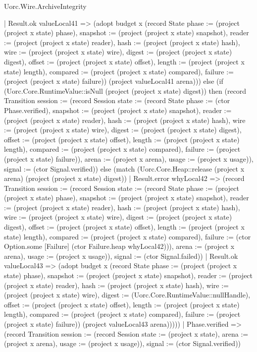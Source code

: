 \begin{lexlean}{Uorc.Wire.ArchiveIntegrity}
\begin{semanticmodule}
{        | Result.ok valueLocal41 => (adopt budget x (record State {phase := (project (project x state) phase), snapshot := (project (project x state) snapshot), reader := (project (project x state) reader), hash := (project (project x state) hash), wire := (project (project x state) wire), digest := (project (project x state) digest), offset := (project (project x state) offset), length := (project (project x state) length), compared := (project (project x state) compared), failure := (project (project x state) failure)}) (project valueLocal41 arena))) else (if (Uorc.Core.RuntimeValue::isNull (project (project x state) digest)) then (record Transition {session := (record Session {state := (record State {phase := (ctor Phase.verified), snapshot := (project (project x state) snapshot), reader := (project (project x state) reader), hash := (project (project x state) hash), wire := (project (project x state) wire), digest := (project (project x state) digest), offset := (project (project x state) offset), length := (project (project x state) length), compared := (project (project x state) compared), failure := (project (project x state) failure)}), arena := (project x arena), usage := (project x usage)}), signal := (ctor Signal.verified)}) else (match (Uorc.Core.Heap::release (project x arena) (project (project x state) digest))
        | Result.error whyLocal42 => (record Transition {session := (record Session {state := (record State {phase := (project (project x state) phase), snapshot := (project (project x state) snapshot), reader := (project (project x state) reader), hash := (project (project x state) hash), wire := (project (project x state) wire), digest := (project (project x state) digest), offset := (project (project x state) offset), length := (project (project x state) length), compared := (project (project x state) compared), failure := (ctor Option.some [Failure] (ctor Failure.heap whyLocal42))}), arena := (project x arena), usage := (project x usage)}), signal := (ctor Signal.failed)})
        | Result.ok valueLocal43 => (adopt budget x (record State {phase := (project (project x state) phase), snapshot := (project (project x state) snapshot), reader := (project (project x state) reader), hash := (project (project x state) hash), wire := (project (project x state) wire), digest := (Uorc.Core.RuntimeValue::nullHandle), offset := (project (project x state) offset), length := (project (project x state) length), compared := (project (project x state) compared), failure := (project (project x state) failure)}) (project valueLocal43 arena)))))
      | Phase.verified => (record Transition {session := (record Session {state := (project x state), arena := (project x arena), usage := (project x usage)}), signal := (ctor Signal.verified)})
}
\end{semanticmodule}
\end{lexlean}

